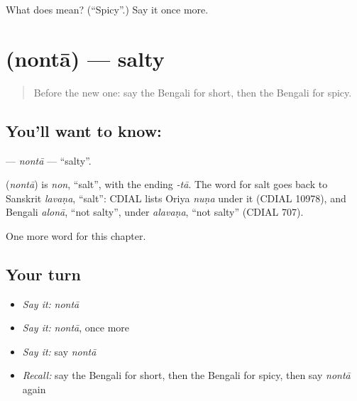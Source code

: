 \begin{tcolorbox}[breakable,colback=teal!4,colframe=teal!35!black,title={Before you move on}]
What does  mean? (\textquotedblleft{}Spicy\textquotedblright{}.) Say it once more.
\end{tcolorbox}
\section[\texorpdfstring{\bn{নোনতা} (nontā)}{নোনতা (nontā)}]{ (nontā) — salty}

\label{lesson:BN-C134-nonta}



\begin{quote}
Before the new one: say the Bengali for short, then the Bengali for spicy.
\end{quote}

\subsection*{You'll want to know: }
\textbf{} — \emph{nontā} — \textquotedblleft{}salty\textquotedblright{}.

\begin{cousinweb}
\textbf{} (\emph{nontā}) is \emph{non}, \textquotedblleft{}salt\textquotedblright{}, with the ending \emph{-tā}. The word for salt goes back to Sanskrit \emph{lavaṇa}, \textquotedblleft{}salt\textquotedblright{}: CDIAL lists Oriya \emph{nuṇa} under it (CDIAL 10978), and Bengali \emph{alonā}, \textquotedblleft{}not salty\textquotedblright{}, under \emph{alavaṇa}, \textquotedblleft{}not salty\textquotedblright{} (CDIAL 707).
\end{cousinweb}

\begin{grammarlens}[title={What you've built}]
One more word for this chapter.
\end{grammarlens}

\subsection*{Your turn}
\begin{itemize}
\raggedright
  \item \emph{Say it:} \emph{nontā}
  \item \emph{Say it:} \emph{nontā}, once more
  \item \emph{Say it:} say \emph{nontā}
  \item \emph{Recall:} say the Bengali for short, then the Bengali for spicy, then say \emph{nontā} again
\end{itemize}

